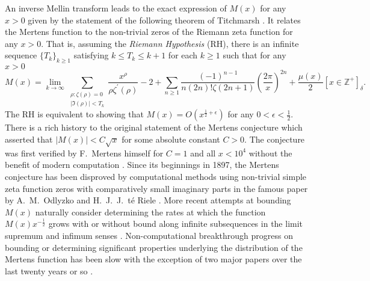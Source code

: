 \documentclass[10pt,reqno,letterpaper]{article}
\theoremstyle{plain}
\numberwithin{theorem}{section}
\theoremstyle{definition}
\newcommand{\Iverson}[1]{\ensuremath{\left[#1\right]_{\delta}}}
\begin{document}
An inverse Mellin transform leads to the exact expression of $M(x)$ for any $x > 0$ 
given by the statement of the following theorem of Titchmarsh \cite{TITCHMARSH}. 
It relates the Mertens function 
to the non-trivial zeros of the Riemann zeta function for any $x > 0$. 
That is, assuming the \emph{Riemann Hypothesis} (RH), there is an infinite sequence 
$\{T_k\}_{k \geq 1}$ satisfying $k \leq T_k \leq k+1$ for each $k \geq 1$ 
such that for any $x > 0$ 
\[
M(x) = \lim_{k \rightarrow \infty} 
     \sum_{\substack{\rho: \zeta(\rho) = 0 \\ |\Im(\rho)| < T_k}} 
     \frac{x^{\rho}}{\rho \zeta^{\prime}(\rho)} - 2 + 
     \sum_{n \geq 1} \frac{(-1)^{n-1}}{n (2n)! \zeta(2n+1)} 
     \left(\frac{2\pi}{x}\right)^{2n} + 
     \frac{\mu(x)}{2} \Iverson{x \in \mathbb{Z}^{+}}. 
\]
The RH is equivalent to showing that 
$M(x) = O\left(x^{\frac{1}{2}+\epsilon}\right)$ for any 
$0 < \epsilon < \frac{1}{2}$. 
There is a rich history to the original statement of the Mertens conjecture which 
asserted that $|M(x)| < C \sqrt{x}$ for some absolute constant $C > 0$.
The conjecture was first verified by F.~Mertens himself for $C = 1$ and all $x < 10^{4}$ 
without the benefit of modern computation \cite{HAVIL-GAMMA}. 
Since its beginnings in 1897, the Mertens conjecture has been disproved by computational methods using 
non-trivial simple zeta function zeros with comparatively small imaginary parts in the famous paper by 
A.~M.~Odlyzko and H.~J.~J.~t\'{e} Riele \cite{ODLYZ-TRIELE}. 
More recent attempts 
at bounding $M(x)$ naturally consider determining the rates at which the function 
$M(x) x^{-\frac{1}{2}}$ grows with or without bound along infinite 
subsequences in the limit supremum and infimum senses 
\cite{ORDER-MERTENSFN}. 
Non-computational breakthrough progress on 
bounding or determining significant properties 
underlying the distribution of the Mertens function has been slow with the 
exception of two major papers over the last twenty years or so 
\cite{NG-MERTENS,SOUND-MERTENS-ANNALS}. 
\end{document}
